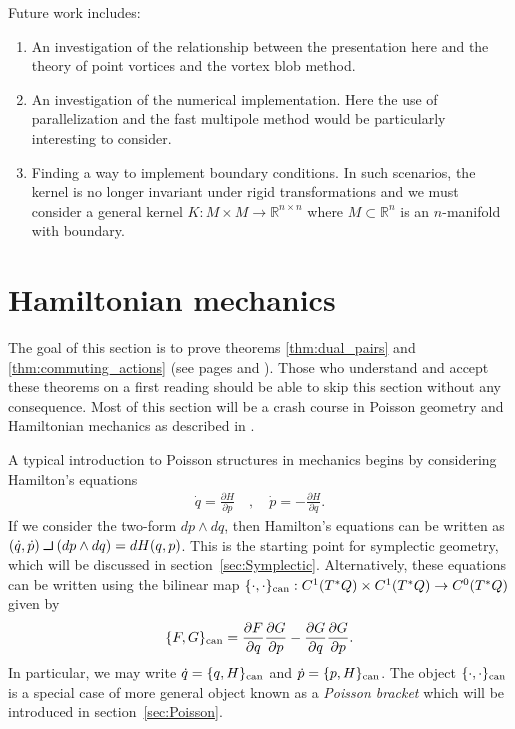 \documentclass[12pt]{amsart}
\newcommand{\pder}[2]{\ensuremath{\frac{\partial #1}{\partial #2}}}
\def\contract{\makebox[1.2em][c]{\mbox{\rule{.6em}
{.01truein}\rule{.01truein}{.6em}}}}
\begin{document}
Future work includes:
\begin{enumerate}
	\item An investigation of the relationship between the presentation here and the theory of point vortices and the vortex blob method.
	\item An investigation of the numerical implementation.
		Here the use of parallelization and the fast multipole method would be particularly interesting to consider.
	\item Finding a way to implement boundary conditions.
		In such scenarios, the kernel is no longer invariant under rigid transformations
		and we must consider a general kernel $K:M \times M \to \mathbb{R}^{n \times n}$
		where $M \subset \mathbb{R}^n$ is an $n$-manifold with boundary.
\end{enumerate}

\appendix

\section{Hamiltonian mechanics}
\label{sec:Hamiltonian}
The goal of this section is to prove theorems \ref{thm:dual_pairs}
and \ref{thm:commuting_actions} (see pages \pageref{thm:dual_pairs} and \pageref{thm:commuting_actions}).
Those who understand and accept these theorems on a first reading
should be able to skip this section without any consequence.
Most of this section will be a crash course in Poisson geometry
and Hamiltonian mechanics as described in \cite{FOM,MandS,Weinstein1983}.

A typical introduction to Poisson structures in mechanics
begins by considering Hamilton's equations
\begin{align*}
  \dot{q} = \pder{H}{p} \quad, \quad  \dot{p} = - \pder{H}{q}.
\end{align*}
If we consider the two-form $dp \wedge dq$, then Hamilton's equations
can be written as $(\dot{q},\dot{p}) \contract (dp \wedge dq) = dH(q,p)$.
This is the starting point for symplectic geometry, which
will be discussed in section~\ref{sec:Symplectic}.
Alternatively, these equations can be written using the bilinear map $\{ \cdot , \cdot \}_{\rm can} : C^1( T^*Q) \times C^1(T^*Q) \to C^0(T^*Q)$
given by
\begin{align*}
  \{ F , G \}_{\rm can} = \pder{F}{q}\pder{G}{p} - \pder{G}{q} \pder{G}{p}.
\end{align*}
In particular, we may write $\dot{q} = \{ q , H \}_{\rm can}$ and $\dot{p} = \{ p , H\}_{\rm can}$.
The object $\{ \cdot , \cdot \}_{\rm can}$ is a special case of more general
object known as a \emph{Poisson bracket} which will be introduced in
section~\ref{sec:Poisson}.
\end{document}
